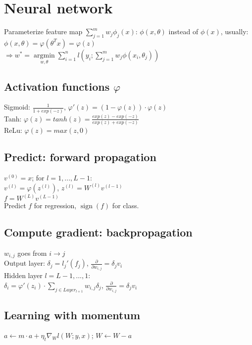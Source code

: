 \section*{Neural network}
Parameterize feature map $\sum_{j=1}^m w_j \phi_j(x)$: $\phi(x,\theta)$ instead of $\phi(x)$, usually: $\phi(x,\theta) = \varphi(\theta^T x) = \varphi(z)$\\
$\Rightarrow w^* = \underset{w, \theta}{\operatorname{argmin}} \sum_{i=1}^n l(y_i; \sum_{j=1}^m w_j \phi(x_i, \theta_j))$

\subsection*{Activation functions $\varphi$}
Sigmoid: $\frac{1}{1+exp(-z)}$,  $\varphi'(z) = (1 - \varphi(z))\cdot\varphi(z)$\\
Tanh: $\varphi(z) = tanh(z) = \frac{exp(z)-exp(-z)}{exp(z)+exp(-z)}$\\
ReLu:  $\varphi(z) = max(z,0)$

\subsection*{Predict: forward propagation}
$v^{(0)} = x$; for $l = 1,...,L-1$: \\
$v^{(l)} = \varphi(z^{(l)})$, $z^{(l)} = W^{(l)}v^{(l-1)}$\\
$f = W^{(L)}v^{(L-1)}$\\
Predict $f$ for regression, $\operatorname{sign}(f)$ for class.

\subsection*{Compute gradient: backpropagation}
$w_{i,j}$ goes from $i \rightarrow j$\\
Output layer: 
$\delta_j = l_j'(f_j)$,
$\frac{\partial}{\partial w_{i,j}} = \delta_j v_i$\\
Hidden layer $l=L-1,...,1$:\\
$\delta_i = \varphi'(z_i) \cdot \sum_{j\in Layer_{l+1}} w_{i,j}\delta_j$,
$\frac{\partial}{\partial w_{i,j}} = \delta_j v_i$

\subsection*{Learning with momentum}
$a \leftarrow m \cdot a + \eta_t \nabla_W l(W;y,x)$; $W \leftarrow W - a$